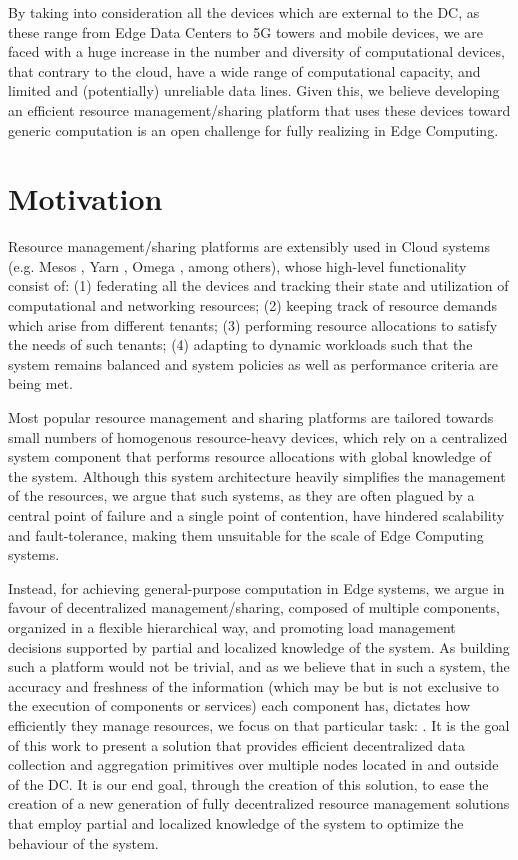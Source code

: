 By taking into consideration all the devices which are external to the DC, as these range from Edge Data Centers to 5G towers and mobile devices, we are faced with a huge increase in the number and diversity of computational devices, that contrary to the cloud, have a wide range of computational capacity, and limited and (potentially) unreliable data lines. Given this, we believe developing an efficient resource management/sharing platform that uses these devices toward generic computation is an open challenge for fully realizing in Edge Computing.

\section{Motivation}

Resource management/sharing platforms are extensibly used in Cloud systems (e.g. Mesos \cite{hindman2011mesos}, Yarn \cite{Vavilapalli2013ApacheHY}, Omega \cite{41684}, among others), whose high-level functionality consist of: (1) federating all the devices and tracking their state and utilization of computational and networking resources; (2) keeping track of resource demands which arise from different tenants; (3) performing resource allocations to satisfy the needs of such tenants; (4) adapting to dynamic workloads such that the system remains balanced and system policies as well as performance criteria are being met.

Most popular resource management and sharing platforms are tailored towards small numbers of homogenous resource-heavy devices, which rely on a centralized system component that performs resource allocations with global knowledge of the system. Although this system architecture heavily simplifies the management of the resources, we argue that such systems, as they are often plagued by a central point of failure and a single point of contention, have hindered scalability and fault-tolerance, making them unsuitable for the scale of Edge Computing systems. 

Instead, for achieving general-purpose computation in Edge systems, we argue in favour of decentralized management/sharing, composed of multiple components, organized in a flexible hierarchical way, and promoting load management decisions supported by partial and localized knowledge of the system. As building such a platform would not be trivial, and as we believe that in such a system, the accuracy and freshness of the information (which may be but is not exclusive to the execution of components or services) each component has, dictates how efficiently they manage resources, we focus on that particular task: . It is the goal of this work to present a solution that provides efficient decentralized data collection and aggregation primitives over multiple nodes located in and outside of the DC. It is our end goal, through the creation of this solution, to ease the creation of a new generation of fully decentralized resource management solutions that employ partial and localized knowledge of the system to optimize the behaviour of the system.

